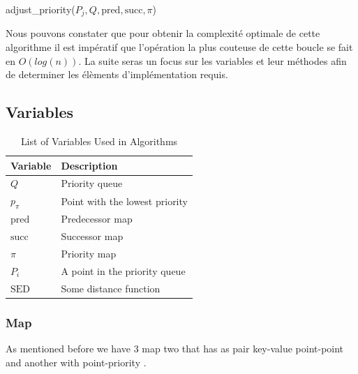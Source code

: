 \documentclass[twoside,12pt, a4paper]{report}
\begin{document}
\begin{algorithm}[H]
	\DontPrintSemicolon
	
	
	\caption{adjust\_priority($P_j, Q, \text{pred}, \text{succ}, \pi$)}
	\label{alg:adjust_priority}
\end{algorithm}


Nous pouvons constater que pour obtenir la complexité optimale de cette algorithme il est impératif que l'opération la plus couteuse de cette boucle se fait en $O(log(n))$. La suite seras un focus sur les variables et leur méthodes afin de determiner les élèments d'implémentation requis. 

\subsection{Variables}


\begin{table}[h!]
	\centering
	\label{tab:variables}
	\begin{tabular}{ll}
		\hline
		\textbf{Variable} & \textbf{Description} \\
		\hline
		$Q$             & Priority queue \\
		$p_{\pi}$       & Point with the lowest priority \\
		$\text{pred}$   & Predecessor map \\
		$\text{succ}$   & Successor map \\
		$\pi$           & Priority map \\
		$P_i$           & A point in the priority queue \\
		$\text{SED}$    & Some distance function \\
		\hline
	\end{tabular}
    \caption{List of Variables Used in Algorithms}
\end{table}

\subsubsection{Map}

As mentioned before we have 3 map two that has as pair key-value point-point and another with point-priority . 
\end{document}
